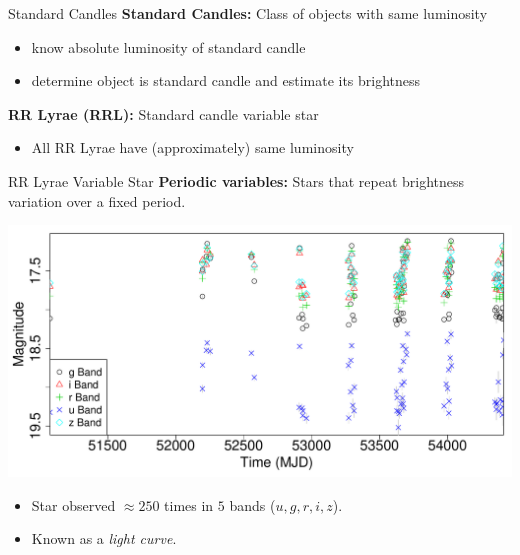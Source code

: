 \documentclass[12pt]{beamer}
\begin{document}
\begin{frame}{Standard Candles}
  \textbf{Standard Candles:} Class of objects with same luminosity
  \begin{itemize}
  \item know absolute luminosity of standard candle
  \item determine object is standard candle and estimate its brightness
  \end{itemize}

  \vspace{.3in}
  
  \textbf{RR Lyrae (RRL):} Standard candle variable star
  \begin{itemize}
  \item All RR Lyrae have (approximately) same luminosity
  \end{itemize}
\end{frame}

\begin{frame}{RR Lyrae Variable Star}
\textbf{Periodic variables:} Stars that repeat brightness variation over a fixed period.
\begin{center}
\includegraphics[scale=.3]{figs/unfolded_13350.pdf}
\end{center}


  \begin{itemize}
    \item Star observed $\approx 250$ times in $5$ bands ($u,g,r,i,z$).
    \item Known as a \textit{light curve}.
  \end{itemize}

\end{frame}
\end{document}
